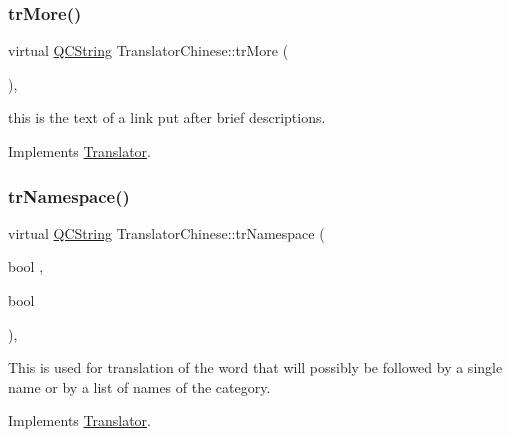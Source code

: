 \mbox{\label{class_translator_chinese_ab0054ca2bf47c0cb2e13568a7081cf05}} 
\subsubsection{\texorpdfstring{trMore()}{trMore()}}
{\footnotesize\ttfamily virtual \mbox{\hyperlink{class_q_c_string}{Q\+C\+String}} Translator\+Chinese\+::tr\+More (\begin{DoxyParamCaption}{ }\end{DoxyParamCaption})\hspace{0.3cm}{\ttfamily [inline]}, {\ttfamily [virtual]}}

this is the text of a link put after brief descriptions. 

Implements \mbox{\hyperlink{class_translator}{Translator}}.

\mbox{\label{class_translator_chinese_a2ee387435759d7648133e813a574b27d}} 
\subsubsection{\texorpdfstring{trNamespace()}{trNamespace()}}
{\footnotesize\ttfamily virtual \mbox{\hyperlink{class_q_c_string}{Q\+C\+String}} Translator\+Chinese\+::tr\+Namespace (\begin{DoxyParamCaption}\item[{bool}]{,  }\item[{bool}]{ }\end{DoxyParamCaption})\hspace{0.3cm}{\ttfamily [inline]}, {\ttfamily [virtual]}}

This is used for translation of the word that will possibly be followed by a single name or by a list of names of the category. 

Implements \mbox{\hyperlink{class_translator}{Translator}}.

\mbox{\label{class_translator_chinese_a1c43cb8ee1dbfb68e27b2eb23c7b3bbf}} 
